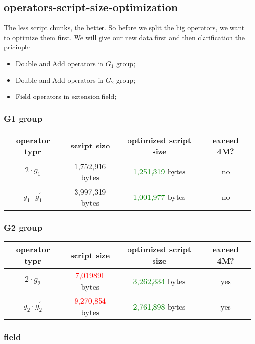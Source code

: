 \subsection{operators-script-size-optimization}

The less script chunks, the better. So before we split the big operators, we want to optimize them first. We will give our new
data first and then clarification the pricinple.

\begin{itemize}
    \item Double and Add operators in $G_1$ group;
    \item Double and Add operators in $G_2$ group;
    \item Field operators in extension field;
\end{itemize}

\subsubsection{G1 group}

\begin{tabular}{|c|c|c|c|} \hline
operator typr & script size & optimized script size & exceed 4M? \\ \hline
$2 \cdot g_1$ & 1,752,916 bytes & \textcolor{green}{1,251,319} bytes & no  \\ \hline
$g_1 \cdot g_1^{'}$ & 3,997,319 bytes &	\textcolor{green}{1,001,977} bytes & no \\ \hline
\end{tabular}

\subsubsection{G2 group}

\begin{tabular}{|c|c|c|c|} \hline
operator typr & script size & optimized script size & exceed 4M? \\ \hline
$2 \cdot g_2$ & \textcolor{red}{7,019891} bytes & \textcolor{green}{3,262,334} bytes & yes  \\ \hline
$g_2 \cdot g_2^{'}$ & \textcolor{red}{9,270,854} bytes & \textcolor{green}{2,761,898} bytes & yes \\ \hline
\end{tabular}

\subsubsection{field}

